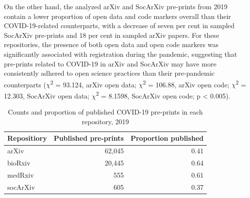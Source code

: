 \documentclass[
]{article}
\begin{document}
On the other hand, the analyzed arXiv and SocArXiv pre-prints from 2019 contain a lower proportion of open data and code markers overall than their COVID-19-related counterparts, with a decrease of seven per cent in sampled SocArXiv pre-prints and 18 per cent in sampled arXiv papers. For these repositories, the presence of both open data and open code markers was significantly associated with registration during the pandemic, suggesting that pre-prints related to COVID-19 in arXiv and SocArXiv may have more consistently adhered to open science practices than their pre-pandemic counterparts (\(\chi\)\textsuperscript{2} = 93.124, arXiv open data; \(\chi\)\textsuperscript{2} = 106.88, arXiv open code; \(\chi\)\textsuperscript{2} = 12.303, SocArXiv open data; \(\chi\)\textsuperscript{2} = 8.1598, SocArXiv open code; p \textless{} 0.005).

\begin{table}

\caption{\label{tab:2019-published}Counts and proportion of published COVID-19 pre-prints in each repository, 2019}
\centering
\begin{tabular}[t]{l|r|r}
\hline
Repositiory & Published pre-prints & Proportion published\\
\hline
arXiv & 62,045 & 0.41\\
\hline
bioRxiv & 20,445 & 0.64\\
\hline
medRxiv & 555 & 0.61\\
\hline
socArXiv & 605 & 0.37\\
\hline
\end{tabular}
\end{table}
\end{document}
